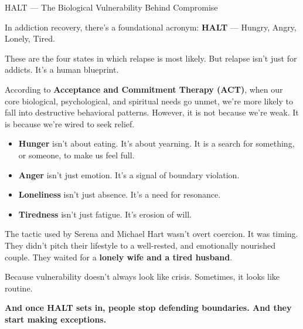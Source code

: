 \begin{TechnicalSidebar}{HALT --- The Biological Vulnerability Behind Compromise}

  In addiction recovery, there’s a foundational acronym: \textbf{HALT} — Hungry, Angry, Lonely, Tired.

  \medskip
  
  These are the four states in which relapse is most likely.  
  But relapse isn’t just for addicts. It’s a human blueprint.
  
  \medskip
  
  According to \textbf{Acceptance and Commitment Therapy (ACT)}, when our core biological, psychological, 
  and spiritual needs go unmet, we’re 
  more likely to fall into destructive behavioral patterns. However, it is not because we’re weak. 
  It is because we’re wired to seek relief.  
  
  \medskip
 
  \begin{itemize}
    \item \textbf{Hunger} isn’t about eating. It’s about yearning.
  It is a search for something, or someone, to make us feel full.


    \item \textbf{Anger} isn’t just emotion. It’s a signal of boundary violation.  


    \item \textbf{Loneliness} isn’t just absence. It’s a need for resonance.  


    \item \textbf{Tiredness} isn’t just fatigue. It’s erosion of will.
  \end{itemize}
  
  \medskip
  
  The tactic used by Serena and Michael Hart wasn’t overt coercion. It was timing.  
  They didn’t pitch their lifestyle to a well-rested, and emotionally nourished couple.  
  They waited for a \textbf{lonely wife and a tired husband}.

  \medskip
  
  Because vulnerability doesn’t always look like crisis.  
  Sometimes, it looks like routine.
  
  \medskip
  
  \textbf{And once HALT sets in, people stop defending boundaries. And they start making exceptions.}

\end{TechnicalSidebar}


